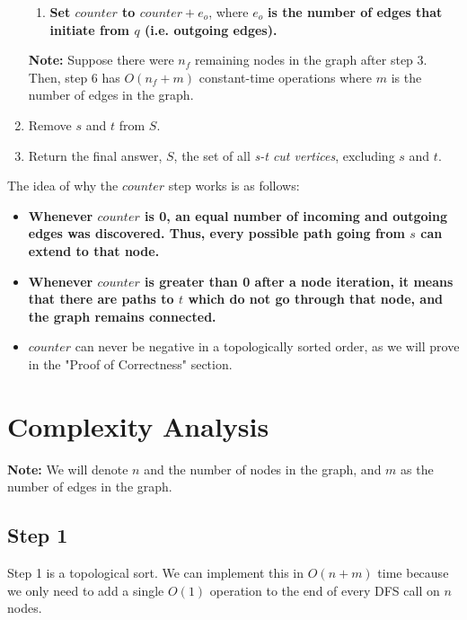 \documentclass{article}
\begin{document}
\begin{enumerate}
\begin{enumerate}
            \item \textbf{Set $counter$ to $counter + e_o$}, where $e_o$ \textbf{is the number of edges that initiate from $q$ (i.e. outgoing edges).}
        \end{enumerate}

        \textbf{Note:} Suppose there were $n_f$ remaining nodes in the graph after step 3. Then, step 6 has $O(n_f + m)$ constant-time operations where $m$ is the number of edges in the graph.  
    
    \item Remove $s$ and $t$ from $S$.
    \item Return the final answer, $S$, the set of all \emph{s-t cut vertices}, excluding $s$ and $t$.

\end{enumerate}

    The idea of why the $counter$ step works is as follows:

    \begin{itemize}
        \item \textbf{Whenever $counter$ is 0, an equal number of incoming and outgoing edges was discovered. Thus, every possible path going from $s$ can extend to that node.}
        \item \textbf{Whenever $counter$ is greater than 0 after a node iteration, it means that there are paths to $t$ which do not go through that node, and the graph remains connected.  }
        \item $counter$ can never be negative in a topologically sorted order, as we will prove in the "Proof of Correctness" section.
    \end{itemize}


\section{Complexity Analysis}

\textbf{Note:} We will denote $n$ and the number of nodes in the graph, and $m$ as the number of edges in the graph. 

\subsection*{Step 1}

Step 1 is a topological sort. We can implement this in $O(n + m)$ time because we only need to add a single $O(1)$ operation to the end of every DFS call on $n$ nodes. 
\end{document}
